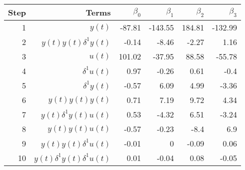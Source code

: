 \begin{tabular}{rrrrrr}
Step & Terms & $\beta_{0}$ & $\beta_{1}$ & $\beta_{2}$ & $\beta_{3}$ \\ 
\hline 
1 & $y(t)$ & -87.81 & -143.55 & 184.81 & -132.99 \\ 
2 & $y(t)y(t)\delta^1 y(t)$ & -0.14 & -8.46 & -2.27 & 1.16 \\ 
3 & $u(t)$ & 101.02 & -37.95 & 88.58 & -55.78 \\ 
4 & $\delta^1 u(t)$ & 0.97 & -0.26 & 0.61 & -0.4 \\ 
5 & $\delta^1 y(t)$ & -0.57 & 6.09 & 4.99 & -3.36 \\ 
6 & $y(t)y(t)y(t)$ & 0.71 & 7.19 & 9.72 & 4.34 \\ 
7 & $y(t)\delta^1 y(t)u(t)$ & 0.53 & -4.32 & 6.51 & -3.24 \\ 
8 & $y(t)y(t)u(t)$ & -0.57 & -0.23 & -8.4 & 6.9 \\ 
9 & $y(t)y(t)\delta^1 u(t)$ & -0.01 & 0 & -0.09 & 0.06 \\ 
10 & $y(t)\delta^1 y(t)\delta^1 u(t)$ & 0.01 & -0.04 & 0.08 & -0.05 \\ 
\hline 
\end{tabular}
